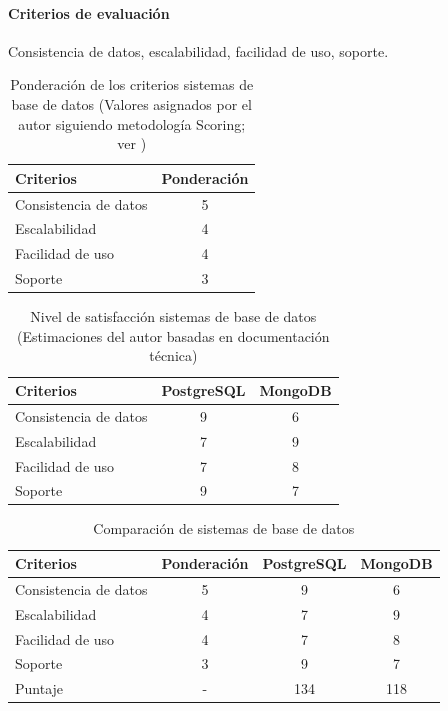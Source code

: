 \paragraph{Criterios de evaluación}
Consistencia de datos, escalabilidad, facilidad de uso, soporte.
\begin{table}[ht]
\centering
\caption{Ponderación de los criterios sistemas de base de datos (Valores asignados por el autor siguiendo metodología Scoring; ver \cite{belton2002})}
\begin{tabular}{l c}
\hline
Criterios & Ponderación \\
\hline
Consistencia de datos & 5 \\
Escalabilidad & 4 \\
Facilidad de uso & 4 \\
Soporte & 3 \\
\hline
\end{tabular}
\end{table}

\begin{table}[ht]
\centering
\caption{Nivel de satisfacción sistemas de base de datos (Estimaciones del autor basadas en documentación técnica)}
\begin{tabular}{l c c}
\hline
Criterios & PostgreSQL & MongoDB \\
\hline
Consistencia de datos & 9 & 6 \\
Escalabilidad & 7 & 9 \\
Facilidad de uso & 7 & 8 \\
Soporte & 9 & 7 \\
\hline
\end{tabular}
\end{table}

\begin{table}[ht]
\centering
\caption{Comparación de sistemas de base de datos}
\begin{tabular}{l c c c}
\hline
Criterios & Ponderación & PostgreSQL & MongoDB \\
\hline
Consistencia de datos & 5 & 9 & 6 \\
Escalabilidad & 4 & 7 & 9 \\
Facilidad de uso & 4 & 7 & 8 \\
Soporte & 3 & 9 & 7 \\
\hline
Puntaje & - & 134 & 118 \\
\hline
\end{tabular}
\end{table}

